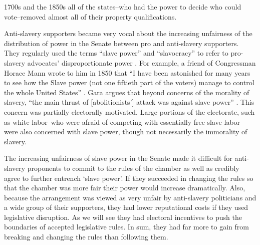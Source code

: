 \documentclass[a4paper]{article}\usepackage[]{graphicx}\usepackage[]{color}
\begin{document}
1700s and the 1850s all of the states--who had the power to decide who could vote--removed almost all of their property qualifications.

Anti-slavery supporters became very vocal about the increasing unfairness of the distribution of power in the Senate between pro and anti-slavery supporters. They regularly used the terms ``slave power'' and ``slavocracy'' to refer to pro-slavery advocates' disproportionate power \citep{richards2000}. For example, a friend of Congressman Horace Mann wrote to him in 1850 that ``I have been astonished for many years to see how the Slave power (not one fiftieth part of the voters) manage to control the whole United States'' \citep[quoted in][6]{Gara1969}. Gara argues that beyond concerns of the morality of slavery, ``the main thrust of [abolitionists'] attack was against slave power'' \citeyearpar[6]{Gara1969}. This concern was partially electorally motivated. Large portions of the electorate, such as white labor--who were afraid of competing with essentially free slave labor--were also concerned with slave power, though not necessarily the immorality of slavery. 

The increasing unfairness of slave power in the Senate made it difficult for anti-slavery proponents to commit to the rules of the chamber as well as credibly agree to further entrench `slave power'. If they succeeded in changing the rules so that the chamber was more fair their power would increase dramatically. Also, because the arrangement was viewed as very unfair by anti-slavery politicians and a wide group of their supporters, they had lower reputational costs if they used legislative disruption. As we will see they had electoral incentives to push the boundaries of accepted legislative rules. In sum, they had far more to gain from breaking and changing the rules than following them.
\end{document}
